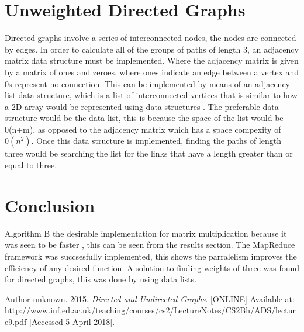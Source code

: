 \documentclass[twocolumn]{IEEEtran}
\begin{document}
	
	\section{Unweighted Directed Graphs}
	Directed graphs involve a series of interconnected nodes, the nodes are connected by edges. In order to calculate all of the groups of paths of length 3, an adjacency matrix data structure must be implemented. Where the adjacency matrix is given by a matrix of ones and zeroes, where ones indicate an edge between a vertex and 0s represent no connection. This can be implemented by means of an adjacency list data structure, which is a list of interconnected vertices that is similar to how a 2D array would be represented using data structures \cite{graph}. The preferable data structure would be the data list, this is because the space of the list would be 0(n+m), as opposed to the adjacency matrix which has a space  compexity of $0(n^{2})$.
	Once this data structure is implemented, finding the paths of length three would be searching the list for the links that have a length greater than or equal to three.


\section{Conclusion}
Algorithm B the desirable implementation for matrix multiplication because it was seen to be faster , this can be seen from the results section. The MapReduce framework was succsesfully implemented, this shows the parralelism improves the efficiency of any desired function. A solution to finding weights of three was found for directed graphs, this was done by using data lists.




	\begin{thebibliography}{12}
		Author unknown. 2015. \textit{Directed and Undirected Graphs}. [ONLINE] Available at: \url{http://www.inf.ed.ac.uk/teaching/courses/cs2/LectureNotes/CS2Bh/ADS/lecture9.pdf} [Accessed 5 April 2018].
	\end{thebibliography}
\end{document}
